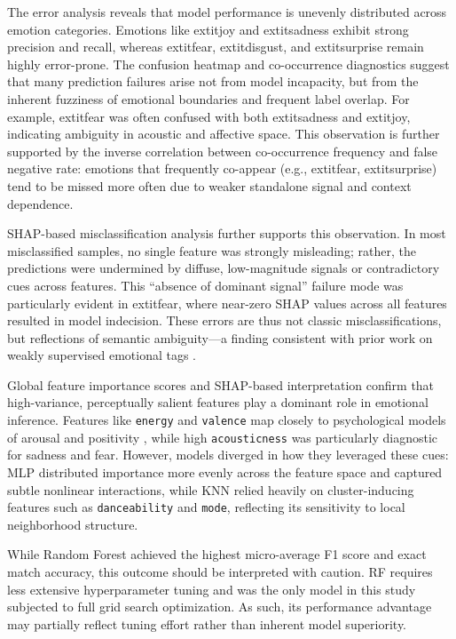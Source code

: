 \documentclass{article}
\begin{document}
The error analysis reveals that model performance is unevenly distributed across emotion categories. Emotions like 	extit{joy} and 	extit{sadness} exhibit strong precision and recall, whereas 	extit{fear}, 	extit{disgust}, and 	extit{surprise} remain highly error-prone. The confusion heatmap and co-occurrence diagnostics suggest that many prediction failures arise not from model incapacity, but from the inherent fuzziness of emotional boundaries and frequent label overlap. For example, 	extit{fear} was often confused with both 	extit{sadness} and 	extit{joy}, indicating ambiguity in acoustic and affective space. This observation is further supported by the inverse correlation between co-occurrence frequency and false negative rate: emotions that frequently co-appear (e.g., 	extit{fear}, 	extit{surprise}) tend to be missed more often due to weaker standalone signal and context dependence.

SHAP-based misclassification analysis further supports this observation. In most misclassified samples, no single feature was strongly misleading; rather, the predictions were undermined by diffuse, low-magnitude signals or contradictory cues across features. This “absence of dominant signal” failure mode was particularly evident in 	extit{fear}, where near-zero SHAP values across all features resulted in model indecision. These errors are thus not classic misclassifications, but reflections of semantic ambiguity—a finding consistent with prior work on weakly supervised emotional tags \parencite{Artemova2025, Kim2024}.

Global feature importance scores and SHAP-based interpretation confirm that high-variance, perceptually salient features play a dominant role in emotional inference. Features like \texttt{energy} and \texttt{valence} map closely to psychological models of arousal and positivity \parencite{Huron2015, McCraty1998}, while high \texttt{acousticness} was particularly diagnostic for sadness and fear. However, models diverged in how they leveraged these cues: MLP distributed importance more evenly across the feature space and captured subtle nonlinear interactions, while KNN relied heavily on cluster-inducing features such as \texttt{danceability} and \texttt{mode}, reflecting its sensitivity to local neighborhood structure.

While Random Forest achieved the highest micro-average F1 score and exact match accuracy, this outcome should be interpreted with caution. RF requires less extensive hyperparameter tuning and was the only model in this study subjected to full grid search optimization. As such, its performance advantage may partially reflect tuning effort rather than inherent model superiority.
\end{document}
